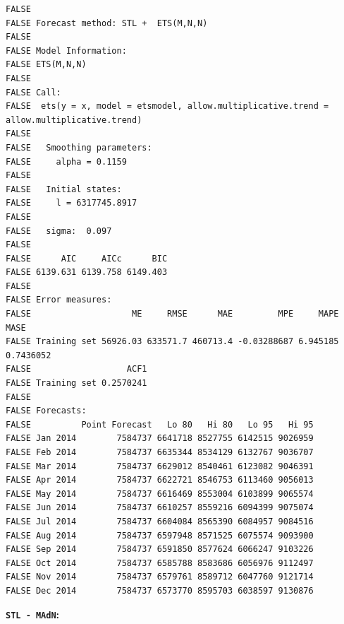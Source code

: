 \documentclass[openany]{book}
\begin{document}
\begin{verbatim}
FALSE 
FALSE Forecast method: STL +  ETS(M,N,N)
FALSE 
FALSE Model Information:
FALSE ETS(M,N,N) 
FALSE 
FALSE Call:
FALSE  ets(y = x, model = etsmodel, allow.multiplicative.trend = allow.multiplicative.trend) 
FALSE 
FALSE   Smoothing parameters:
FALSE     alpha = 0.1159 
FALSE 
FALSE   Initial states:
FALSE     l = 6317745.8917 
FALSE 
FALSE   sigma:  0.097
FALSE 
FALSE      AIC     AICc      BIC 
FALSE 6139.631 6139.758 6149.403 
FALSE 
FALSE Error measures:
FALSE                    ME     RMSE      MAE         MPE     MAPE      MASE
FALSE Training set 56926.03 633571.7 460713.4 -0.03288687 6.945185 0.7436052
FALSE                   ACF1
FALSE Training set 0.2570241
FALSE 
FALSE Forecasts:
FALSE          Point Forecast   Lo 80   Hi 80   Lo 95   Hi 95
FALSE Jan 2014        7584737 6641718 8527755 6142515 9026959
FALSE Feb 2014        7584737 6635344 8534129 6132767 9036707
FALSE Mar 2014        7584737 6629012 8540461 6123082 9046391
FALSE Apr 2014        7584737 6622721 8546753 6113460 9056013
FALSE May 2014        7584737 6616469 8553004 6103899 9065574
FALSE Jun 2014        7584737 6610257 8559216 6094399 9075074
FALSE Jul 2014        7584737 6604084 8565390 6084957 9084516
FALSE Aug 2014        7584737 6597948 8571525 6075574 9093900
FALSE Sep 2014        7584737 6591850 8577624 6066247 9103226
FALSE Oct 2014        7584737 6585788 8583686 6056976 9112497
FALSE Nov 2014        7584737 6579761 8589712 6047760 9121714
FALSE Dec 2014        7584737 6573770 8595703 6038597 9130876
\end{verbatim}

\textbf{\texttt{STL\ -\ MAdN}:}
\end{document}
